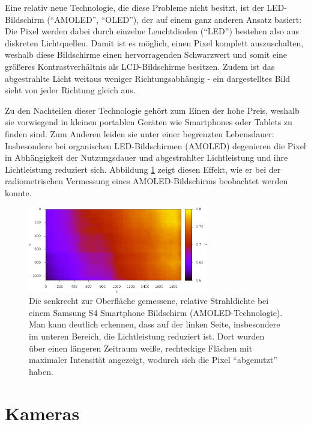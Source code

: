  
    Eine relativ neue Technologie, die diese Probleme nicht besitzt, ist der LED-Bildschirm (``AMOLED'', ``OLED''), der auf einem ganz anderen Ansatz basiert:
    Die Pixel werden dabei durch einzelne Leuchtdioden (``LED'') bestehen also aus diskreten Lichtquellen. 
    Damit ist es möglich, einen Pixel komplett auszuschalten, weshalb diese Bildschirme einen hervorragenden Schwarzwert und somit eine größeres Kontrastverhältnis als LCD-Bildschirme besitzen.
    Zudem ist das abgestrahlte Licht weitaus weniger Richtungsabhängig - ein dargestelltes Bild sieht von jeder Richtung gleich aus.

    Zu den Nachteilen dieser Technologie gehört zum Einen der hohe Preis, weshalb sie vorwiegend in kleinen portablen Geräten wie Smartphones oder Tablets zu finden sind. 
    Zum Anderen leiden sie unter einer begrenzten Lebensdauer:
    Insbesondere bei organischen LED-Bildschirmen (AMOLED) degenieren die Pixel in Abhängigkeit der Nutzungsdauer und abgestrahlter Lichtleistung und ihre Lichtleistung reduziert sich.
    Abbildung \ref{fig:amoled_usage} zeigt diesen Effekt, wie er bei der radiometrischen Vermessung eines AMOLED-Bildschirms beobachtet werden konnte.

  \begin{figure}[H]
    \centering
    \includegraphics[width=0.7\textwidth]{../graphics/grundlagen/s4_usage_map.png}
    \caption[Abgenutzte Pixel eines LED-Bildschirms]{ Die senkrecht zur Oberfläche gemessene, relative Strahldichte bei einem Samsung S4 Smartphone Bildschirm (AMOLED-Technologie).
   Man kann deutlich erkennen, dass auf der linken Seite, insbesondere im unteren Bereich, die Lichtleistung reduziert ist.  
   Dort wurden über einen längeren Zeitraum weiße, rechteckige Flächen mit maximaler Intensität angezeigt, wodurch sich die Pixel ``abgenutzt'' haben. }
    \label{fig:amoled_usage}
   \end{figure}


 \section{Kameras} \label{pinhole}
   
